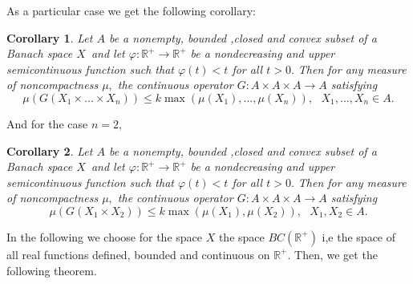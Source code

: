 \documentclass{amsart}
\theoremstyle{plain}
\newtheorem{corollary}{Corollary}
\numberwithin{equation}{section}
\begin{document}
As a particular case we get the following corollary:

\begin{corollary}
\cite{Aghajanicoupled}Let $A$ be a nonempty, bounded ,closed and convex
subset of a Banach space $X$\ and let $\varphi :\mathbb{R}^{+}\rightarrow 
\mathbb{R}^{+}$ be a nondecreasing and upper semicontinuous function such
that $\varphi \left( t\right) <t$ for all $t>0.$ Then for any measure of
noncompactness $\mu ,$ the continuous operator $G:A\times A\times
A\rightarrow A$ satisfying\begin{equation*}
\mu \left( G\left( X_{1}\times ...\times X_{n}\right) \right) \leqslant
k\max \left( \mu \left( X_{1}\right) ,...,\mu \left( X_{n}\right) \right) ,\text{ }X_{1},...,X_{n}\in A.
\end{equation*}
\end{corollary}

And for the case $n=2,$

\begin{corollary}
\cite{Aghajanicoupled}Let $A$ be a nonempty, bounded ,closed and convex
subset of a Banach space $X$\ and let $\varphi :\mathbb{R}^{+}\rightarrow 
\mathbb{R}^{+}$ be a nondecreasing and upper semicontinuous function such
that $\varphi \left( t\right) <t$ for all $t>0.$ Then for any measure of
noncompactness $\mu ,$ the continuous operator $G:A\times A\times
A\rightarrow A$ satisfying\begin{equation*}
\mu \left( G\left( X_{1}\times X_{2}\right) \right) \leqslant k\max \left(
\mu \left( X_{1}\right) ,\mu \left( X_{2}\right) \right) ,\text{ }X_{1},X_{2}\in A.
\end{equation*}
\end{corollary}

In the following we choose for the space $X$ the space $BC\left( \mathbb{R}^{+}\right) $ i,e the space of all real functions defined, bounded and
continuous on $\mathbb{R}^{+}.$ Then, we get the following theorem.
\end{document}
